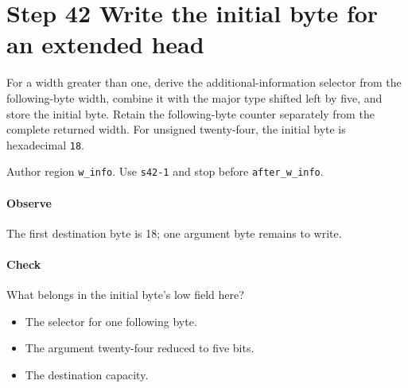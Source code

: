 \section{Step 42 Write the initial byte for an extended head}\label{cbor-s42}
For a width greater than one, derive the additional-information selector from the following-byte width, combine it with the major type shifted left by five, and store the initial byte. Retain the following-byte counter separately from the complete returned width. For unsigned twenty-four, the initial byte is hexadecimal \texttt{18}.

Author region \texttt{w\_info}. Use \texttt{s42-1} and stop before \texttt{after\_w\_info}.

\paragraph{Observe} The first destination byte is 18; one argument byte remains to write.

\paragraph{Check} What belongs in the initial byte's low field here?
\begin{itemize}
  \item[A.] The selector for one following byte.
  \item[B.] The argument twenty-four reduced to five bits.
  \item[C.] The destination capacity.
\end{itemize}
